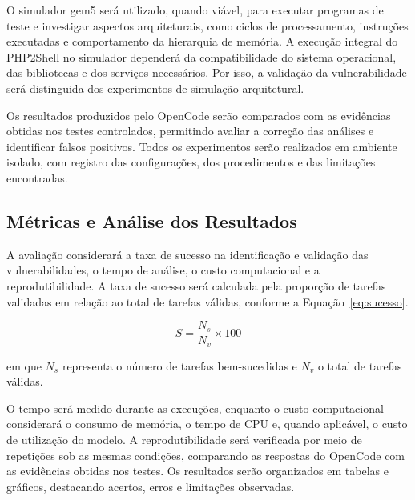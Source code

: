 \documentclass[12pt]{article}
\begin{document}
O simulador gem5 será utilizado, quando viável, para executar
programas de teste e investigar aspectos arquiteturais, como ciclos
de processamento, instruções executadas e comportamento da hierarquia de memória. A execução integral do PHP2Shell no simulador dependerá da compatibilidade do sistema operacional, das bibliotecas e dos serviços necessários. Por isso, a validação da vulnerabilidade será distinguida dos experimentos de simulação arquitetural.

Os resultados produzidos pelo OpenCode serão comparados com as
evidências obtidas nos testes controlados, permitindo avaliar a
correção das análises e identificar falsos positivos. Todos os
experimentos serão realizados em ambiente isolado, com registro
das configurações, dos procedimentos e das limitações encontradas.


\subsection{Métricas e Análise dos Resultados}

A avaliação considerará a taxa de sucesso na identificação e
validação das vulnerabilidades, o tempo de análise, o custo
computacional e a reprodutibilidade. A taxa de sucesso será calculada
pela proporção de tarefas validadas em relação ao total de tarefas
válidas, conforme a Equação~\ref{eq:sucesso}.

\begin{equation}
S = \frac{N_s}{N_v}\times 100
\label{eq:sucesso}
\end{equation}

em que $N_s$ representa o número de tarefas bem-sucedidas e $N_v$
o total de tarefas válidas.

O tempo será medido durante as execuções, enquanto o custo
computacional considerará o consumo de memória, o tempo de CPU e,
quando aplicável, o custo de utilização do modelo. A reprodutibilidade
será verificada por meio de repetições sob as mesmas condições,
comparando as respostas do OpenCode com as evidências obtidas nos
testes. Os resultados serão organizados em tabelas e gráficos,
destacando acertos, erros e limitações observadas.

\end{document}
